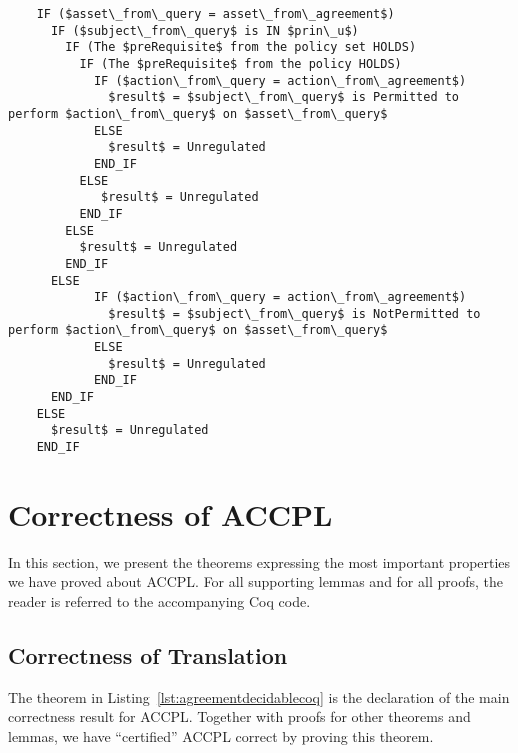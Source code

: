 \documentclass[runningheads,a4paper]{llncs}
\begin{document}
\begin{lstlisting}
    IF ($asset\_from\_query = asset\_from\_agreement$)
      IF ($subject\_from\_query$ is IN $prin\_u$)
        IF (The $preRequisite$ from the policy set HOLDS)
          IF (The $preRequisite$ from the policy HOLDS)
            IF ($action\_from\_query = action\_from\_agreement$)
              $result$ = $subject\_from\_query$ is Permitted to perform $action\_from\_query$ on $asset\_from\_query$
            ELSE
              $result$ = Unregulated
            END_IF            
          ELSE
             $result$ = Unregulated
          END_IF
        ELSE
          $result$ = Unregulated
        END_IF
      ELSE
            IF ($action\_from\_query = action\_from\_agreement$)
              $result$ = $subject\_from\_query$ is NotPermitted to perform $action\_from\_query$ on $asset\_from\_query$
            ELSE
              $result$ = Unregulated
            END_IF
      END_IF
    ELSE
      $result$ = Unregulated
    END_IF
\end{lstlisting}


\section{Correctness of ACCPL}\label{sec:maintheorems}

In this section, we present the theorems expressing the most important
properties we have proved about ACCPL.  For all supporting lemmas and
for all proofs, the reader is referred to the accompanying Coq code.

\subsection{Correctness of Translation}\label{sec:correct}

The theorem in Listing~\ref{lst:agreementdecidablecoq} is the declaration of the main correctness result for \ac{ACCPL}. Together with proofs for other theorems and lemmas, we have ``certified'' \ac{ACCPL} correct by proving this theorem.
\end{document}

